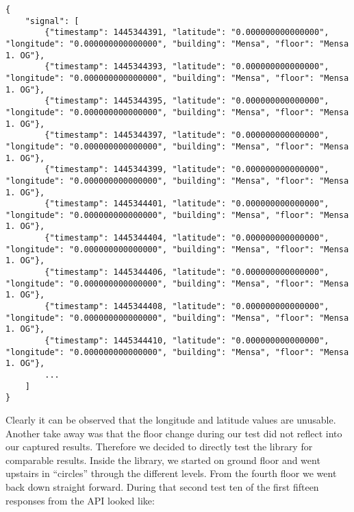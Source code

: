 \begin{lstlisting}
{
    "signal": [
        {"timestamp": 1445344391, "latitude": "0.000000000000000", "longitude": "0.000000000000000", "building": "Mensa", "floor": "Mensa 1. OG"},
        {"timestamp": 1445344393, "latitude": "0.000000000000000", "longitude": "0.000000000000000", "building": "Mensa", "floor": "Mensa 1. OG"},
        {"timestamp": 1445344395, "latitude": "0.000000000000000", "longitude": "0.000000000000000", "building": "Mensa", "floor": "Mensa 1. OG"},
        {"timestamp": 1445344397, "latitude": "0.000000000000000", "longitude": "0.000000000000000", "building": "Mensa", "floor": "Mensa 1. OG"},
        {"timestamp": 1445344399, "latitude": "0.000000000000000", "longitude": "0.000000000000000", "building": "Mensa", "floor": "Mensa 1. OG"},
        {"timestamp": 1445344401, "latitude": "0.000000000000000", "longitude": "0.000000000000000", "building": "Mensa", "floor": "Mensa 1. OG"},
        {"timestamp": 1445344404, "latitude": "0.000000000000000", "longitude": "0.000000000000000", "building": "Mensa", "floor": "Mensa 1. OG"},
        {"timestamp": 1445344406, "latitude": "0.000000000000000", "longitude": "0.000000000000000", "building": "Mensa", "floor": "Mensa 1. OG"},
        {"timestamp": 1445344408, "latitude": "0.000000000000000", "longitude": "0.000000000000000", "building": "Mensa", "floor": "Mensa 1. OG"},
        {"timestamp": 1445344410, "latitude": "0.000000000000000", "longitude": "0.000000000000000", "building": "Mensa", "floor": "Mensa 1. OG"},
        ...
    ]
}
\end{lstlisting}

Clearly it can be observed that the longitude and latitude values are unusable. Another take away was that the floor change during our test did not reflect into our captured results. Therefore we decided to directly test the library for comparable results. Inside the library, we started on ground floor and went upstairs in \enquote{circles} through the different levels. From the fourth floor we went back down straight forward. During that second test ten of the first fifteen responses from the API looked like:

